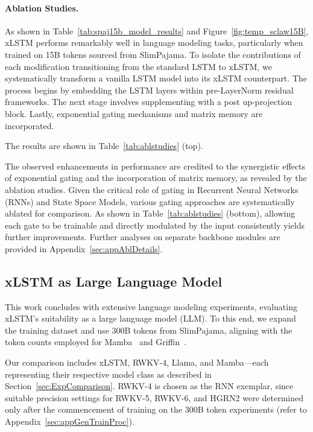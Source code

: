 \paragraph{Ablation Studies.}
As shown in Table~\ref{tab:spaj15b_model_results} and Figure~\ref{fig:temp_sclaw15B}, xLSTM performs remarkably well in language modeling tasks, particularly when trained on 15B tokens sourced from SlimPajama. To isolate the contributions of each modification transitioning from the standard LSTM to xLSTM, we systematically transform a vanilla LSTM model into its xLSTM counterpart. The process begins by embedding the LSTM layers within pre-LayerNorm residual frameworks. The next stage involves supplementing with a post up-projection block. Lastly, exponential gating mechanisms and matrix memory are incorporated.

The results are shown in Table~\ref{tab:ablstudies} (top). 

The observed enhancements in performance are credited to the synergistic effects of exponential gating and the incorporation of matrix memory, as revealed by the ablation studies. Given the critical role of gating in Recurrent Neural Networks (RNNs) and State Space Models, various gating approaches are systematically ablated for comparison. As shown in Table~\ref{tab:ablstudies} (bottom), allowing each gate to be trainable and directly modulated by the input consistently yields further improvements. Further analyses on separate backbone modules are provided in Appendix~\ref{sec:appAblDetails}.

\subsection{xLSTM as Large Language Model}
\label{sec:ExpLanguage}

This work concludes with extensive language modeling experiments, evaluating xLSTM's suitability as a large language model (LLM). To this end, we expand the training dataset and use 300B tokens from SlimPajama, aligning with the token counts employed for Mamba~\citep{Gu:24arxiv} and Griffin~\citep{De:24arxiv}.

Our comparison includes xLSTM, RWKV-4, Llama, and Mamba—each representing their respective model class as described in Section~\ref{sec:ExpComparison}. RWKV-4 is chosen as the RNN exemplar, since suitable precision settings for RWKV-5, RWKV-6, and HGRN2 were determined only after the commencement of training on the 300B token experiments (refer to Appendix~\ref{sec:appGenTrainProc}).

